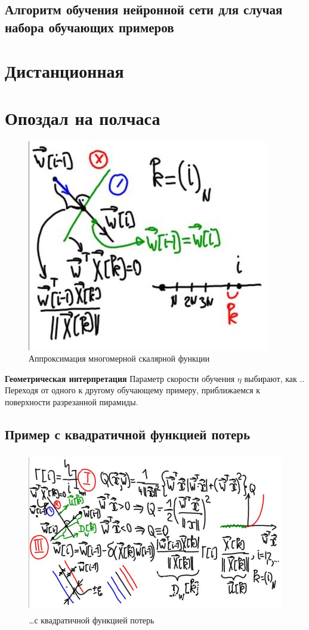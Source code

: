 \documentclass{article}
\begin{document}
\subsection{Алгоритм обучения нейронной сети для случая набора обучающих примеров}




\section{Дистанционная}




\section{Опоздал на полчаса}

\begin{figure}[H]
    \centering
    \includegraphics[height=8 cm]{hyperflat_7_1.jpeg}
    \caption{Аппроксимация многомерной скалярной функции}
    \label{hyperflat_7_1}
\end{figure}

\textbf{Геометрическая интерпретация}
Параметр скорости обучения $\eta$ выбирают, как .. 
Переходя от одного к другому обучающему примеру, приближаемся к поверхности разрезанной пирамиды.

\subsection{Пример с квадратичной функцией потерь}

\begin{figure}[htbp]
    \centering
    \includegraphics[height=7cm]{hyperflat_8_1.jpeg}
    \caption{\dots с квадратичной функцией потерь}
    \label{hyperflat_8_1}
\end{figure}
\end{document}
